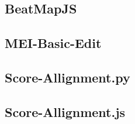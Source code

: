 \subsection{BeatMapJS}

\subsection{MEI-Basic-Edit}
\subsection{Score-Allignment.py}
\subsection{Score-Allignment.js}
